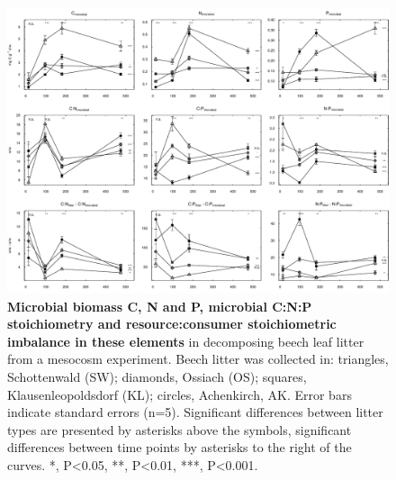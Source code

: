 \documentclass[10pt]{article}
\begin{document}
\begin{flushleft}
\begin{figure}[!ht]
\begin{center}
\includegraphics{ligpaper-mb}
\end{center}
\caption{
{\bf Microbial biomass C, N and P, microbial C:N:P stoichiometry and resource:consumer stoichiometric imbalance in these elements} in decomposing beech leaf litter from a mesocosm experiment. Beech litter was collected in: triangles, Schottenwald (SW); diamonds, Ossiach (OS); squares, Klausenleopoldsdorf (KL); circles, Achenkirch, AK. Error bars indicate standard errors (n=5). Significant differences between litter types are presented by asterisks above the symbols, significant differences between time points by asterisks to the right of the curves. *, P\textless 0.05, **, P\textless 0.01, ***, P\textless 0.001.}
\label{fig:mb}
\end{figure}


\end{flushleft}
\end{document}
